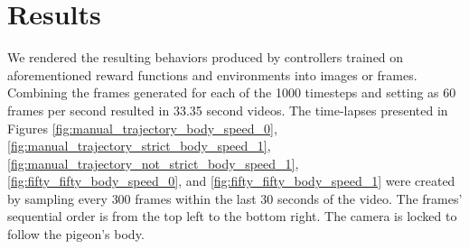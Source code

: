 \chapter{Results}

  We rendered the resulting behaviors produced by controllers trained on aforementioned reward functions and environments into images or frames.
  Combining the frames generated for each of the 1000 timesteps and setting as 60 frames per second resulted in 33.35 second videos.
  The time-lapses presented in Figures \ref{fig:manual_trajectory_body_speed_0}, \ref{fig:manual_trajectory_strict_body_speed_1}, \ref{fig:manual_trajectory_not_strict_body_speed_1}, \ref{fig:fifty_fifty_body_speed_0}, and \ref{fig:fifty_fifty_body_speed_1} were created by sampling every $300$ frames within the last 30 seconds of the video.
  The frames' sequential order is from the top left to the bottom right.
  The camera is locked to follow the pigeon's body.





